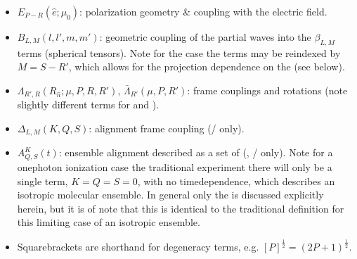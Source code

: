 \documentclass[letterpaper,table,10pt,english]{jupyterBook}
\begin{document}
\begin{itemize}
\item {} 
\sphinxAtStartPar
\({E_{P-R}(\hat{e};\mu_{0})}\): polarization geometry \& coupling with
the electric field.

\item {} 
\sphinxAtStartPar
\(B_{L,M}(l,l',m,m')\): geometric coupling of the partial waves into the \(\beta_{L,M}\) terms (spherical tensors). Note for the {\hyperref[\detokenize{backmatter/glossary:term-AF}]{}} case the terms may be reindexed by \(M=S-R'\), which allows for the projection dependence on the {\hyperref[\detokenize{backmatter/glossary:term-ADMs}]{}} (see below).

\item {} 
\sphinxAtStartPar
\(\Lambda_{R',R}(R_{\hat{n}};\mu,P,R,R')\), \(\bar{\Lambda}_{R'}(\mu,P,R')\): frame couplings and rotations (note slightly different terms for {\hyperref[\detokenize{backmatter/glossary:term-MF}]{}} and {\hyperref[\detokenize{backmatter/glossary:term-AF}]{}}).

\item {} 
\sphinxAtStartPar
\(\Delta_{L,M}(K,Q,S)\): alignment frame coupling ({\hyperref[\detokenize{backmatter/glossary:term-LF}]{}}/{\hyperref[\detokenize{backmatter/glossary:term-AF}]{}} only).

\item {} 
\sphinxAtStartPar
\(A_{Q,S}^{K}(t)\): ensemble alignment described as a set of {\hyperref[\detokenize{backmatter/glossary:term-axis-distribution-moments}]{}} ({\hyperref[\detokenize{backmatter/glossary:term-ADMs}]{}}, {\hyperref[\detokenize{backmatter/glossary:term-LF}]{}}/{\hyperref[\detokenize{backmatter/glossary:term-AF}]{}} only).  Note for a one\sphinxhyphen{}photon ionization case \sphinxhyphen{} the traditional {\hyperref[\detokenize{backmatter/glossary:term-LF}]{}} experiment \sphinxhyphen{} there will only be a single term, \(K=Q=S=0\), with no time\sphinxhyphen{}dependence, which describes an isotropic molecular ensemble. In general only the {\hyperref[\detokenize{backmatter/glossary:term-AF}]{}} is discussed explicitly herein, but it is of note that this is identical to the traditional {\hyperref[\detokenize{backmatter/glossary:term-LF}]{}} definition for this limiting case of an isotropic ensemble.

\item {} 
\sphinxAtStartPar
Square\sphinxhyphen{}brackets are short\sphinxhyphen{}hand for degeneracy terms, e.g. \([P]^{\frac{1}{2}} = (2P+1)^{\frac{1}{2}}\).

\end{itemize}
\end{document}

